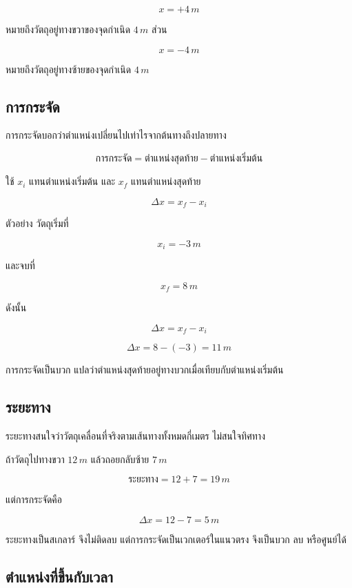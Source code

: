 \[
x=+4\,\si{m}
\]

หมายถึงวัตถุอยู่ทางขวาของจุดกำเนิด $4\,\si{m}$ ส่วน

\[
x=-4\,\si{m}
\]

หมายถึงวัตถุอยู่ทางซ้ายของจุดกำเนิด $4\,\si{m}$

\subsection{การกระจัด}

การกระจัดบอกว่าตำแหน่งเปลี่ยนไปเท่าไรจากต้นทางถึงปลายทาง

\[
\text{การกระจัด}=\text{ตำแหน่งสุดท้าย}-\text{ตำแหน่งเริ่มต้น}
\]

ใช้ $x_i$ แทนตำแหน่งเริ่มต้น และ $x_f$ แทนตำแหน่งสุดท้าย

\[
\Delta x=x_f-x_i
\]

\begin{examplebox}{ตัวอย่าง}
วัตถุเริ่มที่

\[
x_i=-3\,\si{m}
\]

และจบที่

\[
x_f=8\,\si{m}
\]

ดังนั้น

\[
\Delta x=x_f-x_i
\]

\[
\Delta x=8-(-3)=11\,\si{m}
\]

การกระจัดเป็นบวก แปลว่าตำแหน่งสุดท้ายอยู่ทางบวกเมื่อเทียบกับตำแหน่งเริ่มต้น
\end{examplebox}

\subsection{ระยะทาง}

ระยะทางสนใจว่าวัตถุเคลื่อนที่จริงตามเส้นทางทั้งหมดกี่เมตร ไม่สนใจทิศทาง

ถ้าวัตถุไปทางขวา $12\,\si{m}$ แล้วถอยกลับซ้าย $7\,\si{m}$

\[
\text{ระยะทาง}=12+7=19\,\si{m}
\]

แต่การกระจัดคือ

\[
\Delta x=12-7=5\,\si{m}
\]

\begin{tcolorbox}[title=ข้อควรระวัง]
ระยะทางเป็นสเกลาร์ จึงไม่ติดลบ แต่การกระจัดเป็นเวกเตอร์ในแนวตรง จึงเป็นบวก ลบ หรือศูนย์ได้
\end{tcolorbox}

\subsection{ตำแหน่งที่ขึ้นกับเวลา}

